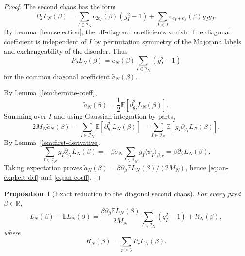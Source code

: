 \documentclass[11pt]{article}
\newtheorem{proposition}[theorem]{Proposition}
\newcommand{\E}{\mathbb{E}}
\newcommand{\R}{\mathbb{R}}
\newcommand{\calI}{\mathcal{I}}
\begin{document}
\begin{proof}
  The second chaos has the form
  \begin{equation}\label{eq:p2-general}
    P_2L_N(\beta)
    =
    \sum_{I\in\calI_N}c_{2e_I}(\beta)(g_I^2-1)
    +
    \sum_{I<J}c_{e_I+e_J}(\beta)g_Ig_J.
  \end{equation}
  By Lemma~\ref{lem:selection}, the off-diagonal coefficients vanish.  The
  diagonal coefficient is independent of $I$ by permutation symmetry of the
  Majorana labels and exchangeability of the disorder.  Thus
  \begin{equation*}
    P_2L_N(\beta)
    =
    \widetilde a_N(\beta)\sum_{I\in\calI_N}(g_I^2-1)
  \end{equation*}
  for the common diagonal coefficient $\widetilde a_N(\beta)$.

  By Lemma~\ref{lem:hermite-coeff},
  \begin{equation}\label{eq:an-second-derivative}
    \widetilde a_N(\beta)=\frac12\E[\partial_{g_I}^2L_N(\beta)].
  \end{equation}
  Summing over $I$ and using Gaussian integration by parts,
  \begin{equation}\label{eq:gibp-second-chaos}
    2M_N\widetilde a_N(\beta)
    =
    \sum_{I\in\calI_N}\E[\partial_{g_I}^2L_N(\beta)]
    =
    \sum_{I\in\calI_N}\E[g_I\partial_{g_I}L_N(\beta)].
  \end{equation}
  By Lemma~\ref{lem:first-derivative},
  \begin{equation}\label{eq:g-derivative-sum}
    \sum_{I\in\calI_N}g_I\partial_{g_I}L_N(\beta)
    =
    -\beta\sigma_N\sum_{I\in\calI_N}g_I\langle\psi_I\rangle_{\beta,g}
    =
    \beta\partial_\beta L_N(\beta).
  \end{equation}
  Taking expectation proves
  $\widetilde a_N(\beta)=\beta\partial_\beta\E L_N(\beta)/(2M_N)$, hence
  \eqref{eq:an-explicit-def} and \eqref{eq:an-coeff}.
\end{proof}

\begin{proposition}[Exact reduction to the diagonal second chaos]
  \label{prop:exact-reduction}
  For every fixed $\beta\in\R$,
  \begin{equation}\label{eq:exact-reduction}
    L_N(\beta)-\E L_N(\beta)
    =
    \frac{\beta\partial_\beta\E L_N(\beta)}{2M_N}
    \sum_{I\in\calI_N}(g_I^2-1)
    +
    R_N(\beta),
  \end{equation}
  where
  \begin{equation}\label{eq:Rn}
    R_N(\beta)=\sum_{r\geq3}P_rL_N(\beta).
  \end{equation}
\end{proposition}
\end{document}
